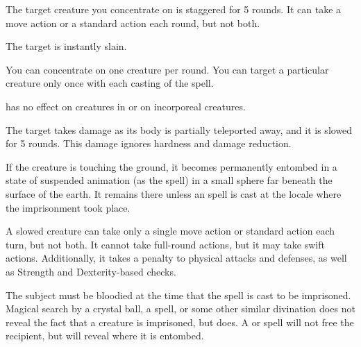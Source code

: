 \spellrng{\rngclose}
\begin{spellhealthy}
  The target creature you concentrate on is staggered for 5 rounds. It can take a move action or a standard action each round, but not both.
\end{spellhealthy}
\begin{spellblood}
  The target is instantly slain.
\end{spellblood}
\begin{spellnotes}
  You can concentrate on one creature per round. You can target a particular creature only once with each casting of the spell.
  \par {} has no effect on creatures in  or on incorporeal creatures.
\end{spellnotes}

\spellrng{\rngclose}
\begin{spelleffect}
  The target takes damage as its body is partially teleported away, and it is slowed for 5 rounds. This damage ignores hardness and damage reduction.
\end{spelleffect}
\begin{spellblood}
  If the creature is touching the ground, it becomes permanently entombed in a state of suspended animation (as the  spell) in a small sphere far beneath the surface of the earth. It remains there unless an  spell is cast at the locale where the imprisonment took place.
\end{spellblood}
\begin{spellnotes}
A slowed creature can take only a single move action or standard action each turn, but not both. It cannot take full-round actions, but it may take swift actions. Additionally, it takes a  penalty to physical attacks and defenses, as well as Strength and Dexterity-based checks.

  The subject must be bloodied at the time that the spell is cast to be imprisoned. Magical search by a crystal ball, a  spell, or some other similar divination does not reveal the fact that a creature is imprisoned, but  does. A  or  spell will not free the recipient, but will reveal where it is entombed.
\end{spellnotes}


